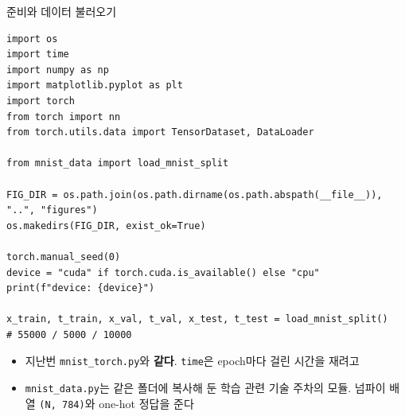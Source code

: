 \documentclass[aspectratio=169,11pt]{beamer}
\newcommand{\code}[1]{\texttt{#1}}
\begin{document}
\begin{frame}{준비와 데이터 불러오기}
\begin{lstlisting}
import os
import time
import numpy as np
import matplotlib.pyplot as plt
import torch
from torch import nn
from torch.utils.data import TensorDataset, DataLoader

from mnist_data import load_mnist_split

FIG_DIR = os.path.join(os.path.dirname(os.path.abspath(__file__)), "..", "figures")
os.makedirs(FIG_DIR, exist_ok=True)

torch.manual_seed(0)
device = "cuda" if torch.cuda.is_available() else "cpu"
print(f"device: {device}")

x_train, t_train, x_val, t_val, x_test, t_test = load_mnist_split()   # 55000 / 5000 / 10000
\end{lstlisting}
\small
\begin{itemize}
\item 지난번 \code{mnist\_torch.py}와 \textbf{같다}. \code{time}은 epoch마다 걸린 시간을 재려고
\item \code{mnist\_data.py}는 같은 폴더에 복사해 둔 학습 관련 기술 주차의 모듈. 넘파이 배열 \code{(N, 784)}와 one-hot 정답을 준다
\end{itemize}
\end{frame}
\end{document}
